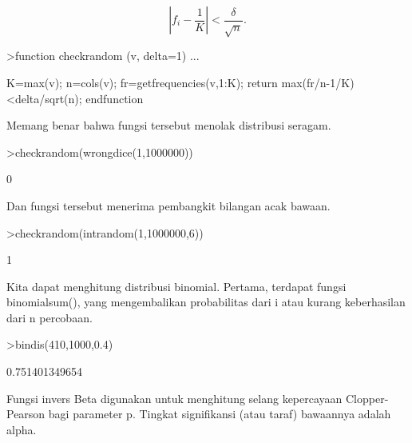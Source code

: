 \documentclass{article}
\newenvironment{eulernotebook}{\par}{\par}
\newenvironment{eulercomment}{\par\medskip}{\par\medskip}
\newenvironment{eulerformula}{}{}
\begin{document}
\begin{eulernotebook}
\begin{eulercomment}
\end{eulercomment}
\begin{eulerformula}
\[
\left|f_i-\frac{1}{K}\right| < \frac{\delta}{\sqrt{n}}.
\]
\end{eulerformula}
\begin{eulerprompt}
>function checkrandom (v, delta=1) ...
\end{eulerprompt}
\begin{eulerudf}
    K=max(v); n=cols(v);
    fr=getfrequencies(v,1:K);
    return max(fr/n-1/K)<delta/sqrt(n);
    endfunction
\end{eulerudf}
\begin{eulercomment}
Memang benar bahwa fungsi tersebut menolak distribusi seragam.
\end{eulercomment}
\begin{eulerprompt}
>checkrandom(wrongdice(1,1000000))
\end{eulerprompt}
\begin{euleroutput}
  0
\end{euleroutput}
\begin{eulercomment}
Dan fungsi tersebut menerima pembangkit bilangan acak bawaan.
\end{eulercomment}
\begin{eulerprompt}
>checkrandom(intrandom(1,1000000,6))
\end{eulerprompt}
\begin{euleroutput}
  1
\end{euleroutput}
\begin{eulercomment}
Kita dapat menghitung distribusi binomial. Pertama, terdapat fungsi
binomialsum(), yang mengembalikan probabilitas dari i atau kurang
keberhasilan dari n percobaan.
\end{eulercomment}
\begin{eulerprompt}
>bindis(410,1000,0.4)
\end{eulerprompt}
\begin{euleroutput}
  0.751401349654
\end{euleroutput}
\begin{eulercomment}
Fungsi invers Beta digunakan untuk menghitung selang kepercayaan
Clopper-Pearson bagi parameter p. Tingkat signifikansi (atau taraf)
bawaannya adalah alpha.


\end{eulercomment}
\end{eulernotebook}
\end{document}
